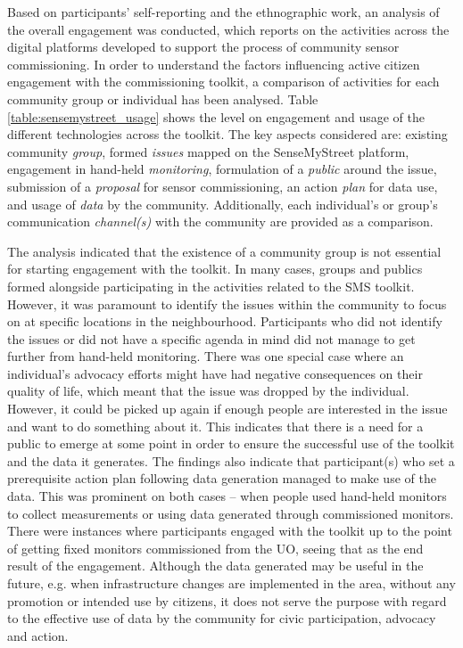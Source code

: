 Based on participants' self-reporting and the ethnographic work, an analysis of the overall engagement was conducted, which reports on the activities across the digital platforms developed to support the process of community sensor commissioning. In order to understand the factors influencing active citizen engagement with the commissioning toolkit, a comparison of activities for each community group or individual has been analysed. Table \ref{table:sensemystreet_usage} shows the level on engagement and usage of the different technologies across the toolkit. The key aspects considered are: existing community \textit{group}, formed \textit{issues} mapped on the SenseMyStreet platform, engagement in hand-held \textit{monitoring}, formulation of a \textit{public} \citep{dewey_public_1954} around the issue, submission of a \textit{proposal} for sensor commissioning, an action \textit{plan} for data use, and usage of \textit{data} by the community. Additionally, each individual's or group's communication \textit{channel(s)} with the community are provided as a comparison.

The analysis indicated that the existence of a community group is not essential for starting engagement with the toolkit. In many cases, groups and publics formed alongside participating in the activities related to the SMS toolkit. However, it was paramount to identify the issues within the community to focus on at specific locations in the neighbourhood. Participants who did not identify the issues or did not have a specific agenda in mind did not manage to get further from hand-held monitoring. There was one special case where an individual's advocacy efforts might have had negative consequences on their quality of life, which meant that the issue was dropped by the individual. However, it could be picked up again if enough people are interested in the issue and want to do something about it. This indicates that there is a need for a public to emerge at some point in order to ensure the successful use of the toolkit and the data it generates. The findings also indicate that participant(s) who set a prerequisite action plan following data generation managed to make use of the data. This was prominent on both cases -- when people used hand-held monitors to collect measurements or using data generated through commissioned monitors. There were instances where participants engaged with the toolkit up to the point of getting fixed monitors commissioned from the UO, seeing that as the end result of the engagement. Although the data generated may be useful in the future, e.g. when infrastructure changes are implemented in the area, without any promotion or intended use by citizens, it does not serve the purpose with regard to the effective use of data by the community for civic participation, advocacy and action.

